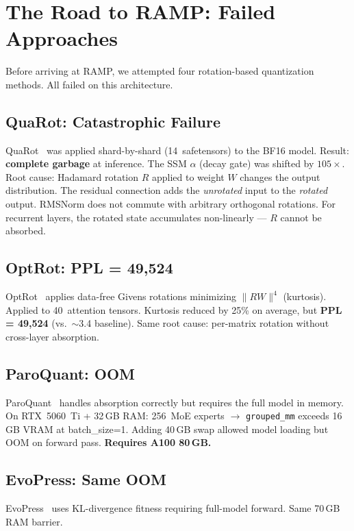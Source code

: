 \documentclass[10pt,a4paper]{article}
\begin{document}
\section{The Road to RAMP: Failed Approaches}

Before arriving at RAMP, we attempted four rotation-based quantization methods. All failed on this architecture.

\subsection{QuaRot: Catastrophic Failure}

QuaRot~\cite{spinquant2024} was applied shard-by-shard (14~safetensors) to the BF16 model. Result: \textbf{complete garbage} at inference. The SSM $\alpha$ (decay gate) was shifted by $105{\times}$. Root cause: Hadamard rotation $R$ applied to weight $W$ changes the output distribution. The residual connection adds the \emph{unrotated} input to the \emph{rotated} output. RMSNorm does not commute with arbitrary orthogonal rotations. For recurrent layers, the rotated state accumulates non-linearly --- $R$ cannot be absorbed.

\subsection{OptRot: PPL = 49{,}524}

OptRot~\cite{optrot2024} applies data-free Givens rotations minimizing $\|RW\|^4$ (kurtosis). Applied to 40~attention tensors. Kurtosis reduced by 25\% on average, but \textbf{PPL = 49{,}524} (vs.\ $\sim$3.4 baseline). Same root cause: per-matrix rotation without cross-layer absorption.

\subsection{ParoQuant: OOM}

ParoQuant~\cite{paroquant2024} handles absorption correctly but requires the full model in memory. On RTX~5060~Ti + 32\,GB RAM: 256~MoE experts $\to$ \texttt{grouped\_mm} exceeds 16\,GB VRAM at batch\_size=1. Adding 40\,GB swap allowed model loading but OOM on forward pass. \textbf{Requires A100 80\,GB.}

\subsection{EvoPress: Same OOM}

EvoPress~\cite{evopress2024} uses KL-divergence fitness requiring full-model forward. Same 70\,GB RAM barrier.
\end{document}
